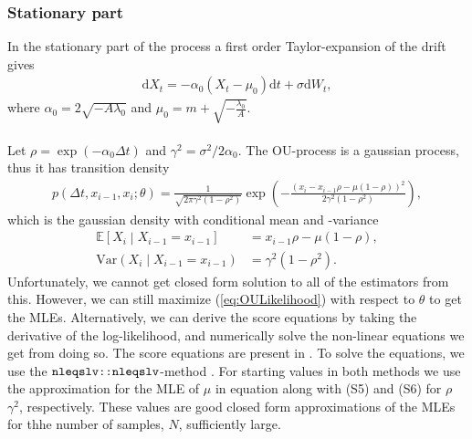 \subsubsection{Stationary part}\label{subsubsec:OUprocessStationary}
In the stationary part of the process a first order Taylor-expansion of the drift gives 
\begin{align}
    \mathrm{d}X_t = -\alpha_0\left(X_t-\mu_0\right) \mathrm{d}t + \sigma \mathrm{d}W_t,
\end{align}
where $\alpha_0 = 2\sqrt{-A\lambda_0}$ and $\mu_0 = m + \sqrt{-\frac{\lambda_0}{A}}$.\\\\
Let $\rho = \exp\left(-\alpha_0\Delta t\right)$ and $\gamma^2 = \sigma^2/2\alpha_0$. The OU-process is a gaussian process, thus it has transition density \cite[equation (S3)]{DitlevsenSupplementary}
\begin{align}
    p\left(\Delta t, x_{i-1}, x_i;\theta\right) = \frac{1}{\sqrt{2\pi\gamma^2\left(1-\rho^2\right)}}\exp\left(-\frac{\left(x_i-x_{i-1}\rho - \mu\left(1-\rho\right)\right)^2}{2\gamma^2\left(1-\rho^2\right)}\right), \label{eq:OULikelihood}
\end{align}
which is the gaussian density with conditional mean and -variance
\begin{align}
    \mathbb{E}\left[X_i\middle|X_{i-1} = x_{i-1}\right] &= x_{i - 1}\rho - \mu\left(1-\rho\right),\\
    \mathrm{Var}\left(X_i\middle|X_{i-1} = x_{i-1}\right) &= \gamma^2\left(1-\rho^2\right).
\end{align}
Unfortunately, we cannot get closed form solution to all of the estimators from this. However, we can still maximize (\ref{eq:OULikelihood}) with respect to $\theta$ to get the MLEs. Alternatively, we can derive the score equations by taking the derivative of the log-likelihood, and numerically solve the non-linear equations we get from doing so. The score equations are present in \cite[p.1, bottom]{DitlevsenSupplementary}. To solve the equations, we use the $\texttt{nleqslv::nleqslv}$-method \cite{nleqslv}. For starting values in both methods we use the approximation for the MLE of $\mu$ in equation \cite[(S4)]{DitlevsenSupplementary} along with (S5) and (S6) for $\rho$ $\gamma^2$, respectively. These values are good closed form approximations of the MLEs for thhe number of samples, $N$, sufficiently large.
